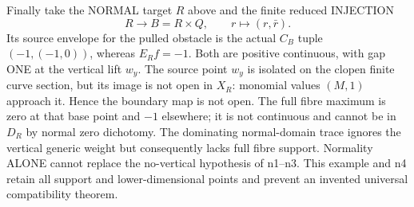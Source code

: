 Finally take the NORMAL target $R$ above and the finite reduced INJECTION
\[
R\longrightarrow B=R\times Q,\qquad r\longmapsto(r,\bar r).
\]
Its source envelope for the pulled obstacle is the actual $C_B$ tuple $(-1,(-1,0))$, whereas $E_Rf=-1$. Both are positive continuous, with gap ONE at the vertical lift $w_y$. The source point $w_y$ is isolated on the clopen finite curve section, but its image is not open in $X_R$: monomial values $(M,1)$ approach it. Hence the boundary map is not open. The full fibre maximum is zero at that base point and $-1$ elsewhere; it is not continuous and cannot be in $D_R$ by normal zero dichotomy. The dominating normal-domain trace ignores the vertical generic weight but consequently lacks full fibre support. Normality ALONE cannot replace the no-vertical hypothesis of n1--n3. This example and n4 retain all support and lower-dimensional points and prevent an invented universal compatibility theorem.

